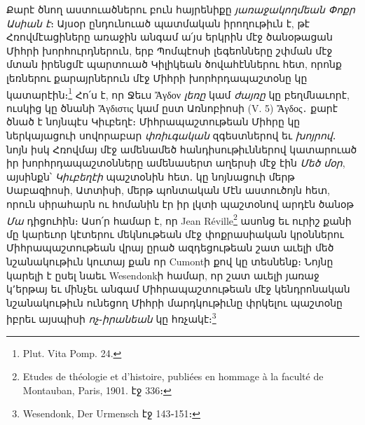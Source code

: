\documentclass{article}
\begin{document}
{Քարէ ծնող աստուածներու բուն հայրենիքը \emph{յառաջակողմեան Փոքր Ասիան է}։ Այսօր ընդունուած պատմական իրողութիւն է, թէ Հռովմէացիները առաջին անգամ ա՛յս երկրին մէջ ծանօթացան Միհրի խորհուրդներուն, երբ Պոմպէոսի լեգեոնները շփման մէջ մտան իրենցմէ պարտուած Կիլիկեան ծովահէններու հետ, որոնք լեռներու քարայրներուն մէջ Միհրի խորհրդապաշտօնը կը կատարէին։\footnote{Plut. Vita Pomp. 24.} Հո՛ս է, որ Ջեւս Ἄγδον \emph{լեռը} կամ \emph{ժայռը} կը բեղմնաւորէ, ուսկից կը ծնանի Ἄγδιστις կամ ըստ Առնոբիոսի (V. 5) Ἄγδος․ քարէ ծնած է նոյնպէս Կիւբեղէ։ Միհրապաշտութեան Միհրը կը ներկայացուի սովորաբար \emph{փռիւգական} զգեստներով եւ \emph{խոյրով}․ նոյն իսկ Հռովմայ մէջ ամենամեծ հանդիսութիւններով կատարուած իր խորհրդապաշտօնները ամենասերտ աղերսի մէջ էին \emph{Մեծ մօր}, այսինքն՝ \emph{Կիւբեղէի} պաշտօնին հետ․ կը նոյնացուի մերթ Սաբազիոսի, Ատտիսի, մերթ պոնտական Մէն աստուծոյն հետ, որուն սիրահարն ու հոմանին էր իր լկտի պաշտօնով արդէն ծանօթ \emph{Մա} դիցուհին։ Ասո՛ր համար է, որ Jean Réville\footnote{Etudes de théologie et d'histoire, publiées en hommage à la faculté de Montauban, Paris, 1901. էջ 336։} ասոնց եւ ուրիշ քանի մը կարեւոր կէտերու մեկնութեան մէջ փոքրասիական կրօններու Միհրապաշտութեան վրայ ըրած ազդեցութեան շատ աւելի մեծ նշանակութիւն կուտայ քան որ Cumontի քով կը տեսնենք։ Նոյնը կարելի է ըսել նաեւ Wesendonkի համար, որ շատ աւելի յառաջ կ՚երթայ եւ մինչեւ անգամ Միհրապաշտութեան մէջ կենդրոնական նշանակութիւն ունեցող Միհրի մարդկութիւնը փրկելու պաշտօնը իբրեւ այսպիսի \emph{ոչ}֊\emph{իրանեան} կը հռչակէ։\footnote{Wesendonk, Der Urmensch էջ 143֊151։}

}
\end{document}
